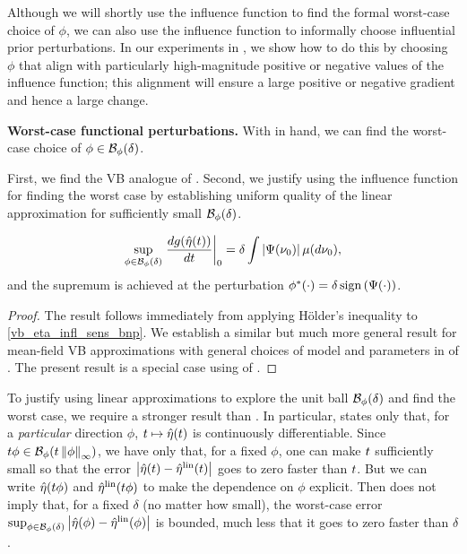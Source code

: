 Although we will shortly use the influence function to find the formal
worst-case choice of $\phi$, we can also use the influence function to
informally choose influential prior perturbations. In our experiments in
, we show how to do this by choosing $\phi$ that align with
particularly high-magnitude positive or negative values of the influence
function; this alignment will ensure a large positive or negative gradient and
hence a large change.

\noindent \textbf{Worst-case functional perturbations.}
%
With  in hand, we can find the worst-case
choice of $\phi \in \mathcal{B}_\phi(\delta)$.

\LinfExamplesFig{}

First, we find the VB analogue of \citet[Result 11]{gustafson:1996:local}.
Second, we justify using the influence function for finding the worst case by
establishing uniform quality of the linear approximation for sufficiently small
$\mathcal{B}_\phi(\delta)$.

\begin{cor}
\begin{align*}
%
\sup_{\phi \in \ball_\phi(\delta)}
    \fracat{d g(\etaopt(\t))}{d \t}{0} =
        \delta \int \abs{\infl(\nu_0)} \mu(d\nu_0),
%
\end{align*}
%
and the supremum is achieved at the perturbation
$\phi^*(\cdot) = \delta \, \mathrm{sign}\left(\Psi(\cdot)\right)$.
%
\end{cor}
%
\begin{proof}
%
The result follows immediately from applying H{\"o}lder's inequality to
\eqref{vb_eta_infl_sens_bnp}. We establish a similar but much more general
result for mean-field VB approximations with general choices of model and
parameters in  of . The
present result is a special case using  of
.
%
\end{proof}

To justify using linear approximations to explore the unit ball
$\mathcal{B}_\phi(\delta)$ and find the worst case, we require a stronger result than
. In particular,  states
only that, for a {\em particular} direction $\phi$, $t \mapsto \hat\eta(t)$ is
continuously differentiable.  Since $t \phi \in \mathcal{B}_\phi(t \left\Vert\phi\right\Vert_{\infty})$,
we have only that, for a fixed $\phi$, one can make $t$ sufficiently small so
that the error $\left|\hat\eta(t) - \hat\eta^{\mathrm{lin}}(t)\right|$ goes to zero faster than $t$.
But we can write $\hat\eta(t\phi)$ and $\hat\eta^{\mathrm{lin}}(t \phi)$ to make the dependence
on $\phi$ explicit. Then  does not imply that, for a
fixed $\delta$ (no matter how small), the worst-case error $\sup_{\phi \in
\mathcal{B}_\phi(\delta)} \left|\hat\eta(\phi) - \hat\eta^{\mathrm{lin}}(\phi)\right|$ is bounded, much less
that it goes to zero faster than $\delta$.

